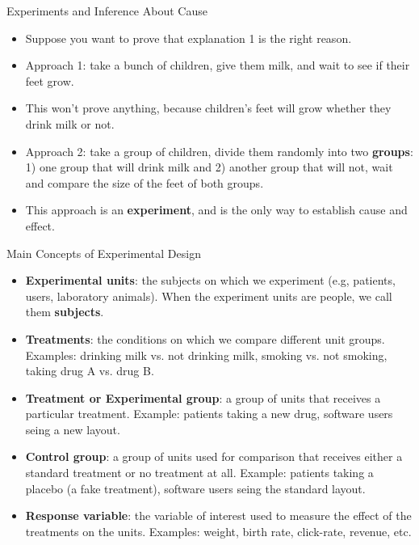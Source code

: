 \documentclass[handout]{beamer}
\begin{document}
\begin{frame}{Experiments and Inference About Cause}
\scriptsize{

\begin{itemize}

 \item Suppose you want to prove that explanation 1 is the right reason.
 \item Approach 1: take a bunch of children, give them milk, and wait to see if their feet grow.
 \item This won't prove anything, because children's feet will grow whether they drink milk or not.
 \item Approach 2: take a group of children, divide them randomly into two \textbf{groups}: 1) one group that will drink milk and 2) another group that will not, wait and compare the size of the feet of both groups. 
 \item This approach is an \textbf{experiment}, and is the only way to establish cause and effect.
 
\end{itemize}



} 
\end{frame}


\begin{frame}{Main Concepts of Experimental Design}
\scriptsize{


\begin{itemize}
 \item \textbf{Experimental units}: the subjects on which we experiment (e.g, patients, users, laboratory animals). When the experiment units are people, we call them  \textbf{subjects}.
 \item \textbf{Treatments}: the conditions on which we compare different unit groups. Examples: drinking milk vs. not drinking milk, smoking vs. not smoking, taking drug A vs. drug B.
 \item \textbf{Treatment or Experimental group}: a group of units that receives a particular treatment. Example: patients taking a new drug, software users seing a new layout.
 \item \textbf{Control group}: a group of units used for comparison that receives either a standard treatment or no treatment at all. Example: patients taking a placebo (a fake treatment), software users seing the standard layout.
 
  \item \textbf{Response variable}: the variable of interest used to measure the effect of the treatments on the units. Examples: weight, birth rate,  click-rate, revenue, etc.
 
\end{itemize}



} 
\end{frame}
\end{document}
